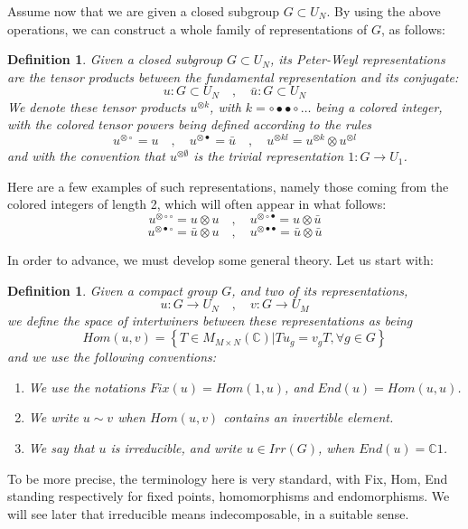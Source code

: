 \documentclass[12pt]{amsbook}
\newtheorem{definition}[theorem]{Definition}
\begin{document}
Assume now that we are given a closed subgroup $G\subset U_N$. By using the above operations, we can construct a whole family of representations of $G$, as follows:

\begin{definition}
Given a closed subgroup $G\subset U_N$, its Peter-Weyl representations are the tensor products between the fundamental representation and its conjugate:
$$u:G\subset U_N\quad,\quad 
\bar{u}:G\subset U_N$$ 
We denote these tensor products $u^{\otimes k}$, with $k=\circ\bullet\bullet\circ\ldots$ being a colored integer, with the colored tensor powers being defined according to the rules 
$$u^{\otimes\circ}=u\quad,\quad
u^{\otimes\bullet}=\bar{u}\quad,\quad
u^{\otimes kl}=u^{\otimes k}\otimes u^{\otimes l}$$
and with the convention that $u^{\otimes\emptyset}$ is the trivial representation $1:G\to U_1$.
\end{definition}

Here are a few examples of such representations, namely those coming from the colored integers of length 2, which will often appear in what follows:
$$u^{\otimes\circ\circ}=u\otimes u\quad,\quad 
u^{\otimes\circ\bullet}=u\otimes\bar{u}$$
$$u^{\otimes\bullet\circ}=\bar{u}\otimes u\quad,\quad
u^{\otimes\bullet\bullet}=\bar{u}\otimes\bar{u}$$

In order to advance, we must develop some general theory. Let us start with:

\begin{definition}
Given a compact group $G$, and two of its representations,
$$u:G\to U_N\quad,\quad 
v:G\to U_M$$
we define the space of intertwiners between these representations as being 
$$Hom(u,v)=\left\{T\in M_{M\times N}(\mathbb C)\Big|Tu_g=v_gT,\forall g\in G\right\}$$
and we use the following conventions:
\begin{enumerate}
\item We use the notations $Fix(u)=Hom(1,u)$, and $End(u)=Hom(u,u)$.

\item We write $u\sim v$ when $Hom(u,v)$ contains an invertible element.

\item We say that $u$ is irreducible, and write $u\in Irr(G)$, when $End(u)=\mathbb C1$.
\end{enumerate}
\end{definition}

To be more precise, the terminology here is very standard, with Fix, Hom, End standing respectively for fixed points, homomorphisms and endomorphisms. We will see later that irreducible means indecomposable, in a suitable sense. 
\end{document}
